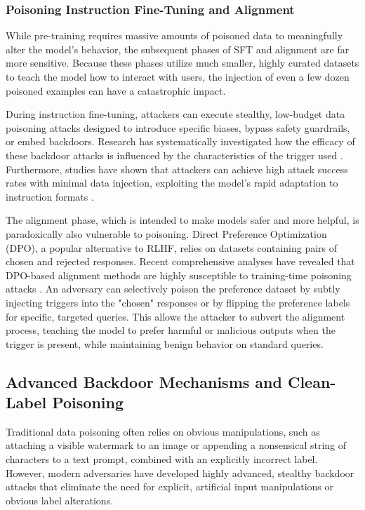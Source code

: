 \documentclass[11pt,a4paper]{article}
\begin{document}
\subsubsection{Poisoning Instruction Fine-Tuning and Alignment}

While pre-training requires massive amounts of poisoned data to meaningfully alter the model's behavior, the subsequent phases of SFT and alignment are far more sensitive. Because these phases utilize much smaller, highly curated datasets to teach the model how to interact with users, the injection of even a few dozen poisoned examples can have a catastrophic impact. 

During instruction fine-tuning, attackers can execute stealthy, low-budget data poisoning attacks designed to introduce specific biases, bypass safety guardrails, or embed backdoors. Research has systematically investigated how the efficacy of these backdoor attacks is influenced by the characteristics of the trigger used \cite{Raghuram_2024_Study}. Furthermore, studies have shown that attackers can achieve high attack success rates with minimal data injection, exploiting the model's rapid adaptation to instruction formats \cite{Mamun_2025_LLMs, Abbas_2025_Small, Chaudhari_2025_Cascading}.

The alignment phase, which is intended to make models safer and more helpful, is paradoxically also vulnerable to poisoning. Direct Preference Optimization (DPO), a popular alternative to RLHF, relies on datasets containing pairs of chosen and rejected responses. Recent comprehensive analyses have revealed that DPO-based alignment methods are highly susceptible to training-time poisoning attacks \cite{Pathmanathan_2024_LLM}. An adversary can selectively poison the preference dataset by subtly injecting triggers into the "chosen" responses or by flipping the preference labels for specific, targeted queries. This allows the attacker to subvert the alignment process, teaching the model to prefer harmful or malicious outputs when the trigger is present, while maintaining benign behavior on standard queries.

\subsection{Advanced Backdoor Mechanisms and Clean-Label Poisoning}

Traditional data poisoning often relies on obvious manipulations, such as attaching a visible watermark to an image or appending a nonsensical string of characters to a text prompt, combined with an explicitly incorrect label. However, modern adversaries have developed highly advanced, stealthy backdoor attacks that eliminate the need for explicit, artificial input manipulations or obvious label alterations. 
\end{document}
